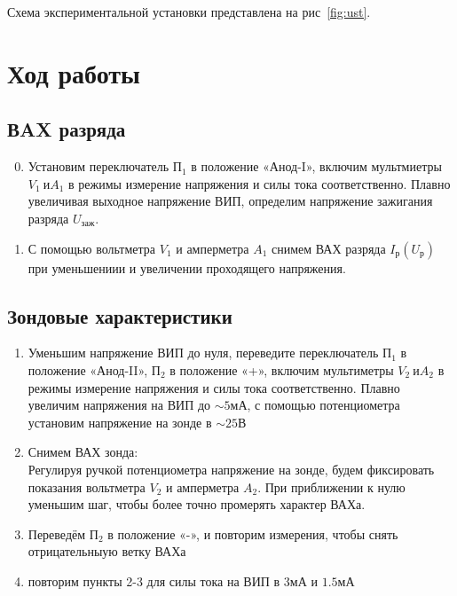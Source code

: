 \documentclass[12pt,a4paper]{article}
\begin{document}
\noindent Схема экспериментальной установки представлена на рис~\ref{fig:ust}.
  
\section*{Ход работы}
\subsection*{ВAX разряда}
\begin{enumerate}
  \setcounter{enumi}{-1}
  \item Установим переключатель $П_1$ в положение «Анод-I», включим
  мультмиетры $V_1\ и A_1$ в режимы измерение напряжения и силы тока соответственно.
  Плав­но увеличивая выходное напряжение ВИП, определим
  напряжение зажигания разряда $U_\text{заж}$.
  \item С помощью вольтметра $V_1$ и амперметра $A_1$ снимем 
  ВАХ разряда $I_\text{р}(U_\text{р})$ при уменьшениии и увеличении 
  проходящего напряжения.
\end{enumerate}

\subsection*{Зондовые характеристики}
\begin{enumerate}
  \item Уменьшим напряжение ВИП до нуля, переведите переключатель $П_1$
  в положение «Анод-II», $П_2$ в положение «+», 
  включим мультиметры  $V_2\ и A_2$ в режимы 
  измерение напряжения и силы тока соответственно. Плавно увеличим 
  напряжения на ВИП до $\sim5мА$, с помощью потенциометра
  установим напряжение на зонде в $\sim25В$
  \item Снимем ВАХ зонда:\\
  Регулируя ручкой потенциометра напряжение на зонде,
  будем фиксировать показания вольтметра $V_2$ и амперметра $A_2$.
  При приближении к нулю уменьшим шаг, чтобы более точно
  промерять характер ВАХа.
  \item Переведём  $П_2$ в положение «-», и повторим измерения, 
  чтобы снять отрицательныую ветку ВАХа
  \item повторим пункты 2-3 для силы тока на ВИП в $3мА$ и $1.5мА$
\end{enumerate}
\newpage
\end{document}
